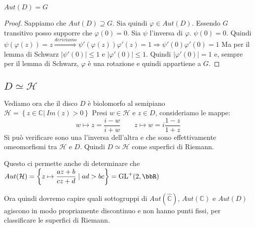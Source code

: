 \begin{proposizione}
$Aut(D)=G$
\end{proposizione}
\begin{proof}
Sappiamo che $Aut(D) \supseteq G$. Sia quindi $\varphi \in Aut(D)$. Essendo $G$ transitivo posso supporre che $\varphi(0)=0$.
Sia $\psi$ l'inversa di $\varphi$. $\psi (0)=0$. Quindi
$\psi (\varphi (z))=z \stackrel{deriviamo}{\Longrightarrow} \psi ' (\varphi (z)) \varphi '(z) =1 \Rightarrow \psi'(0) \varphi'(0) =1$
Ma per il lemma di Schwarz $|\psi'(0)| \leq 1$ e $|\varphi'(0)| \leq 1$. Quindi $|\varphi'(0)|=1$ e, sempre per il lemma di Schwarz,
$\varphi$ è una rotazione e quindi appartiene a $G$. 
\end{proof}

\subsection {$D \simeq \mathcal{H}$}

Vediamo ora che il disco $D$ è biolomorfo al semipiano $\mathcal{H} = \left \{ z \in \mathbb{C} | \ Im (z)>0 \right \}$
Presi $w \in \mathcal{H}$ e $z \in D$, consideriamo le mappe:
$$w \mapsto z=\frac{i-w}{i+w} \qquad z \mapsto w= i\frac{1-z}{1+z}$$
Si può verificare sono una l'inversa dell'altra e che sono effettivamente omeomorfismi tra $\mathcal{H}$ e $D$.
Quindi $D \simeq \mathcal{H}$ come superfici di Riemann.

Questo ci permette anche di determinare che $Aut( \mathcal{H}) = \left \{ z \mapsto \displaystyle{\frac{az+b}{cz+d}} \mid ad > bc \right \} = \GL^+ (2, \bbR)$

Ora quindi dovremo capire quali sottogruppi di $Aut (\hat{\mathbb{C}})$, $Aut(\mathbb{C})$ e $Aut(D)$ agiscono in modo propriamente discontinuo
e non hanno punti fissi, per classificare le superfici di Riemann.